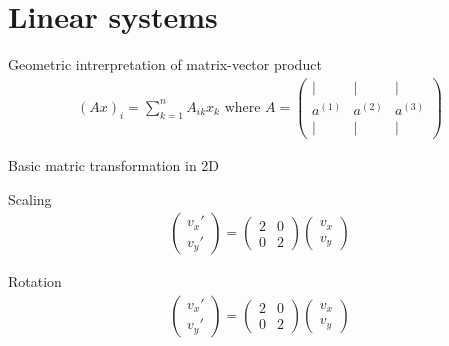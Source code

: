 \section{Linear systems}

\begin{parag}{Geometric intrerpretation of matrix-vector product}
	\begin{align*} \left(Ax\right)_i = \sum_{k= 1}^{n}A_{ik}x_k \text{ where } A = \begin{pmatrix} \mid & \mid & \mid \\ a^{\left(1\right)} & a^{\left(2\right)} & a^{\left(3\right)}\\ \mid & \mid & \mid \end{pmatrix}  \end{align*}

    
\end{parag}



\begin{parag}{Basic matric transformation in 2D}
	\begin{subparag}{Scaling}
	    \begin{align*} \begin{pmatrix} v_x' \\ v_y' \end{pmatrix} = \begin{pmatrix} 2 & 0 \\ 0 & 2 \end{pmatrix} \begin{pmatrix} v_x \\ v_y \end{pmatrix}  \end{align*}
	\end{subparag}
	\begin{subparag}{Rotation}
	    \begin{align*} \begin{pmatrix} v_x' \\ v_y' \end{pmatrix} = \begin{pmatrix} 2 & 0 \\ 0 & 2 \end{pmatrix} \begin{pmatrix} v_x \\ v_y \end{pmatrix}  \end{align*}
	\end{subparag}
    
\end{parag}


